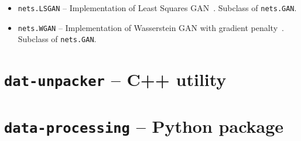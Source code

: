 \begin{itemize}
\item \texttt{nets.LSGAN} -- Implementation of Least Squares GAN~\cite{lsgan}. Subclass of \texttt{nets.GAN}.
\begin{description}
\end{description}
\item \texttt{nets.WGAN} -- Implementation of Wasserstein GAN with gradient penalty~\cite{wgan}. Subclass of \texttt{nets.GAN}.
\begin{description}
\end{description}
\end{itemize}

\section[\texttt{dat-unpacker}]{\texttt{dat-unpacker} -- C++ utility}

\section[\texttt{data-processing}]{\texttt{data-processing} -- Python package}
